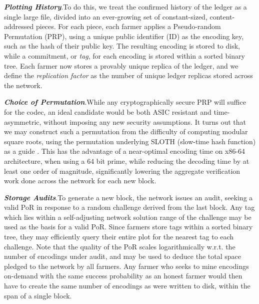 \documentclass[conference]{IEEEtran}
\begin{document}
\vspace{2mm}

\noindent \textbf{\textit{Plotting History}}.\quad To do this, we treat the confirmed history of the ledger as a single large file, divided into an ever-growing set of constant-sized, content-addressed pieces. For each piece, each farmer applies a Pseudo-random Permutation (PRP), using a unique public identifier (ID) as the encoding key, such as the hash of their public key. The resulting encoding is stored to disk, while a commitment, or \textit{tag}, for each encoding is stored within a sorted binary tree. Each farmer now stores a provably unique replica of the ledger, and we define the \textit{replication factor} as the number of unique ledger replicas stored across the network.

\vspace{2mm}

\noindent \textbf{\textit{Choice of Permutation}}.\quad While any cryptographically secure PRP will suffice for the codec, an ideal candidate would be both ASIC resistant and time-asymmetric, without imposing any new security assumptions. It turns out that we may construct such a permutation from the difficulty of computing modular square roots, using the permutation underlying SLOTH (slow-time hash function) as a guide \cite{lenstra2015random}. This has the advantage of a near-optimal encoding time on x86-64 architecture, when using a 64 bit prime, while reducing the decoding time by at least one order of magnitude, significantly lowering the aggregate verification work done across the network for each new block.

\vspace{2mm}

\noindent \textbf{\textit{Storage Audits}}.\quad To generate a new block, the network issues an audit, seeking a valid PoR in response to a random challenge derived from the last block. Any tag which lies within a self-adjusting network solution range of the challenge may be used as the basis for a valid PoR. Since farmers store tags within a sorted binary tree, they may efficiently query their entire plot for the nearest tag to each challenge. Note that the quality of the PoR scales logarithmically w.r.t. the number of encodings under audit, and may be used to deduce the total space pledged to the network by all farmers. Any farmer who seeks to mine encodings on-demand with the same success probability as an honest farmer would then have to create the same number of encodings as were written to disk, within the span of a single block. 
\end{document}
